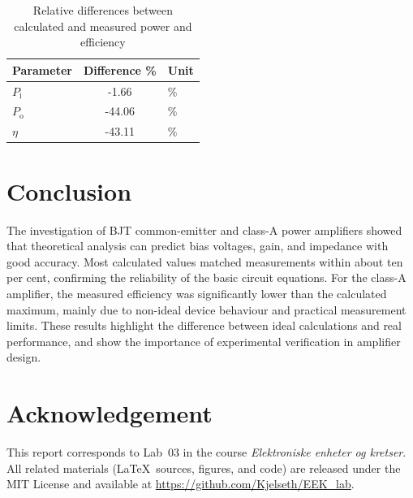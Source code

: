 \documentclass[conference]{IEEEtran}
\newcommand{\Px}[1]{P_\mathrm{#1}}
\begin{document}
\begin{table}[H]
    \centering
    \caption{Relative differences between calculated and measured power and efficiency}
    \label{tab:p6diff}
    \begin{tabular}{l S[table-format=4.2] l}
        \toprule
        Parameter & {Difference \%} & Unit \\
        \midrule
        \(\Px{i}\) & -1.66  & \(\unit{\percent}\) \\
        \(\Px{o}\) & -44.06 & \(\unit{\percent}\) \\
        \(\eta\)   & -43.11 & \(\unit{\percent}\) \\
        \bottomrule
    \end{tabular}
\end{table}





\section{Conclusion}
The investigation of BJT common-emitter and class-A power amplifiers showed that theoretical analysis can predict bias voltages, gain, and impedance with good accuracy.
Most calculated values matched measurements within about ten per cent, confirming the reliability of the basic circuit equations.
For the class-A amplifier, the measured efficiency was significantly lower than the calculated maximum, mainly due to non-ideal device behaviour and practical measurement limits.
These results highlight the difference between ideal calculations and real performance, and show the importance of experimental verification in amplifier design.


\section*{Acknowledgement}
This report corresponds to Lab~03 in the course \emph{Elektroniske enheter og kretser}.
All related materials (\LaTeX~sources, figures, and code) are released under the MIT License and available at \url{https://github.com/Kjelseth/EEK_lab}.

\end{document}
